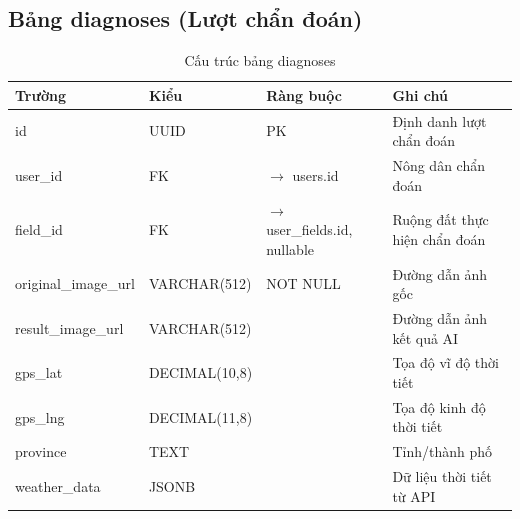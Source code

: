 \documentclass[12pt,a4paper]{article}
\begin{document}
\subsection{Bảng diagnoses (Lượt chẩn đoán)}
\begin{longtable}{|l|l|l|p{5.5cm}|}
    \caption{Cấu trúc bảng diagnoses}                                                                                                                               \\
    \hline
    \rowcolor{headerblue}
    \textbf{Trường}      & \textbf{Kiểu}                                                & \textbf{Ràng buộc}                      & \textbf{Ghi chú}                \\
    \hline
    id                   & UUID                                                         & PK                                      & Định danh lượt chẩn đoán        \\
    \hline
    user\_id             & FK                                                           & $\rightarrow$ users.id                  & Nông dân chẩn đoán              \\
    \hline
    field\_id            & FK                                                           & $\rightarrow$ user\_fields.id, nullable & Ruộng đất thực hiện chẩn đoán   \\
    \hline
    original\_image\_url & VARCHAR(512)                                                 & NOT NULL                                & Đường dẫn ảnh gốc               \\
    \hline
    result\_image\_url   & VARCHAR(512)                                                 &                                         & Đường dẫn ảnh kết quả AI        \\
    \hline
    gps\_lat             & DECIMAL(10,8)                                                &                                         & Tọa độ vĩ độ thời tiết          \\
    \hline
    gps\_lng             & DECIMAL(11,8)                                                &                                         & Tọa độ kinh độ thời tiết        \\
    \hline
    province             & TEXT                                                         &                                         & Tỉnh/thành phố                  \\
    \hline
    weather\_data        & JSONB                                                        &                                         & Dữ liệu thời tiết từ API        \\

\end{longtable}
\end{document}

